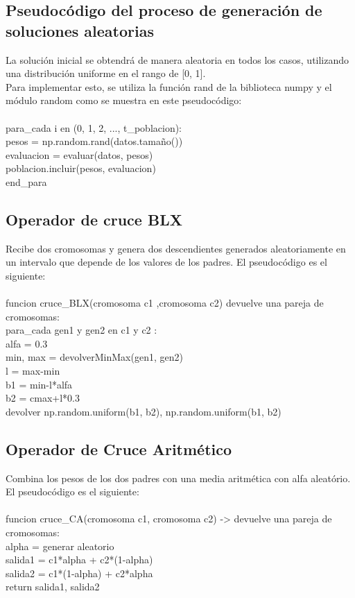 \documentclass[12pt, spanish]{article}
\newcommand\tab[1][1cm]{\hspace*{#1}}
\begin{document}
\subsection{Pseudocódigo del proceso de generación de soluciones aleatorias}
La solución inicial se obtendrá de manera aleatoria en todos los casos, utilizando una distribución uniforme en el rango de [0, 1].\\
\newline
Para implementar esto, se utiliza la función rand de la biblioteca numpy y el módulo random como se muestra en este pseudocódigo:\\
\\
para\_cada i en (0, 1, 2, ...,  t\_poblacion):\\
\tab       	pesos = np.random.rand(datos.tamaño())\\
   \tab    	evaluacion = evaluar(datos, pesos) \\
\tab	poblacion.incluir(pesos, evaluacion)\\
end\_para\\

\subsection{Operador de cruce BLX}
Recibe dos cromosomas y genera dos descendientes generados aleatoriamente en un intervalo que depende de los valores de los padres. El pseudocódigo es el siguiente: \\
\\
funcion cruce\_BLX(cromosoma c1 ,cromosoma c2) devuelve una pareja de cromosomas:\\
\tab    para\_cada gen1 y gen2 en c1 y c2 :	\\
\tab\tab	alfa = 0.3\\
\tab\tab	min, max = devolverMinMax(gen1, gen2)\\
\tab\tab    	l = max-min\\
\tab\tab   	b1 = min-l*alfa\\
\tab\tab    	b2 = cmax+l*0.3\\
\tab\tab    devolver np.random.uniform(b1, b2), np.random.uniform(b1, b2)\\

\subsection{Operador de Cruce Aritmético}
Combina los pesos de los dos padres con una media aritmética con alfa aleatório. El pseudocódigo es el siguiente: \\
\\
funcion cruce\_CA(cromosoma c1, cromosoma c2) -> devuelve una pareja de cromosomas: \\
\tab    alpha = generar aleatorio \\
\tab    salida1 = c1*alpha + c2*(1-alpha)\\
\tab   salida2 = c1*(1-alpha) + c2*alpha\\
\tab    return salida1, salida2\\
\end{document}
